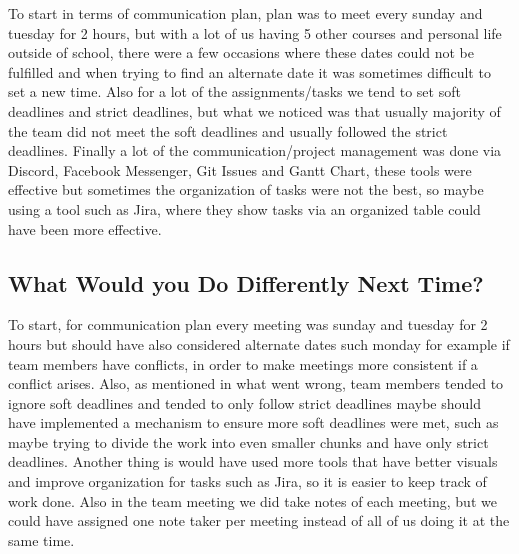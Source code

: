 \documentclass{article}
\begin{document}
To start in terms of communication plan, plan was to meet every sunday and tuesday for 2 hours, but with a lot of us having 5 other courses and personal life outside of school, there were a few occasions where these dates could not be fulfilled and when trying to find an alternate date it was sometimes difficult to set a new time. Also for a lot of the assignments/tasks we tend to set soft deadlines and strict deadlines, but what we noticed was that usually majority of the team did not meet the soft deadlines and usually followed the strict deadlines. Finally a lot of the communication/project management was done via Discord, Facebook Messenger, Git Issues and Gantt Chart, these tools were effective but sometimes the organization of tasks were not the best, so maybe using a tool such as Jira, where they show tasks via an organized table could have been more effective.

\subsection{What Would you Do Differently Next Time?}

To start, for communication plan every meeting was sunday and tuesday for 2 hours but should have also considered alternate dates such monday for example if team members have conflicts, in order to make meetings more consistent if a conflict arises. Also, as mentioned in what went wrong, team members tended to ignore soft deadlines and tended to only follow strict deadlines maybe should have implemented a mechanism to ensure more soft deadlines were met, such as maybe trying to divide the work into even smaller chunks and have only strict deadlines. Another thing is would have used more tools that have better visuals and improve organization for tasks such as Jira, so it is easier to keep track of work done. Also in the team meeting we did take notes of each meeting, but we could have assigned one note taker per meeting instead of all of us doing it at the same time.
\end{document}
